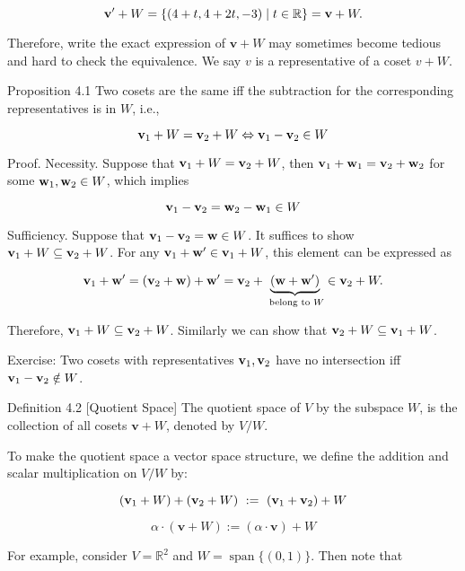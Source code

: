 \documentclass[11pt]{article}
\begin{document}
\[
{\bf v}^{\prime } + W = \{ \left( {4 + t,4 + {2t}, - 3}\right)  \mid  t \in  \mathbb{R}\}  = \mathbf{v} + W.
\]

Therefore, write the exact expression of \(\mathbf{v} + W\) may sometimes become tedious and hard to check the equivalence. We say \(v\) is a representative of a coset \(v + W\).

Proposition 4.1 Two cosets are the same iff the subtraction for the corresponding representatives is in \(W\), i.e.,

\[
{\bf v}_1 + W = {\bf v}_2 + W \Leftrightarrow  {\bf v}_1 - {\bf v}_2 \in  W
\]

Proof. Necessity. Suppose that \({\bf v}_1 + W = {\bf v}_2 + W\), then \({\bf v}_1 + {\bf w}_1 = {\bf v}_2 + {\bf w}_2\) for some \({\bf w}_1,{\bf w}_2 \in  W\), which implies

\[
{\bf v}_1 - {\bf v}_2 = {\bf w}_2 - {\bf w}_1 \in  W
\]

Sufficiency. Suppose that \({\bf v}_1 - {\bf v}_2 = \mathbf{w} \in  W\). It suffices to show \({\bf v}_1 + W \subseteq  {\bf v}_2 + W\). For any \({\bf v}_1 + {\bf w}^{\prime } \in  {\bf v}_1 + W\), this element can be expressed as

\[
{\bf v}_1 + {\bf w}^{\prime } = \left( {{\bf v}_2 + \mathbf{w}}\right)  + {\bf w}^{\prime } = {\bf v}_2 + \underset{\text{ belong to }W}{\underbrace{\left( \mathbf{w} + {\bf w}^{\prime }\right) }} \in  {\bf v}_2 + W.
\]

Therefore, \({\bf v}_1 + W \subseteq  {\bf v}_2 + W\). Similarly we can show that \({\bf v}_2 + W \subseteq  {\bf v}_1 + W\).

Exercise: Two cosets with representatives \({\bf v}_1,{\bf v}_2\) have no intersection iff \({\bf v}_1 - {\bf v}_2 \notin  W\).

Definition 4.2 [Quotient Space] The quotient space of \(V\) by the subspace \(W\), is the collection of all cosets \(\mathbf{v} + W\), denoted by \(V/W\).

To make the quotient space a vector space structure, we define the addition and scalar multiplication on \(V/W\) by:

\[
\left( {{\bf v}_1 + W}\right)  + \left( {{\bf v}_2 + W}\right)  \mathrel{\text{ := }} \left( {{\bf v}_1 + {\bf v}_2}\right)  + W
\]

\[
\alpha  \cdot  \left( {\mathbf{v} + W}\right)  \mathrel{\text{ := }} \left( {\alpha  \cdot  \mathbf{v}}\right)  + W
\]

For example, consider \(V = {\mathbb{R}}^2\) and \(W = \operatorname{span}\{ \left( {0,1}\right) \}\). Then note that
\end{document}
